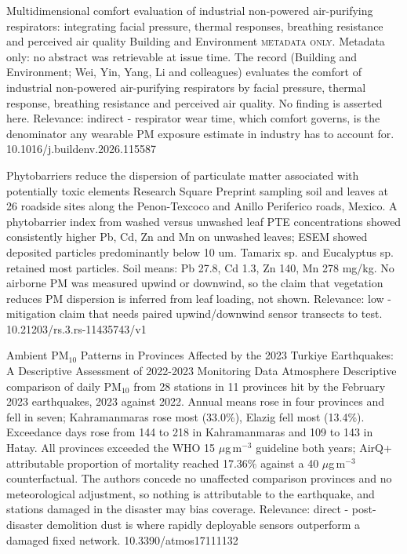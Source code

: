 \documentclass[10pt]{article}
\begin{document}
{Multidimensional comfort evaluation of industrial non-powered air-purifying respirators: integrating facial pressure, thermal responses, breathing resistance and perceived air quality}
{Building and Environment}
{\textsc{metadata only.} Metadata only: no abstract was retrievable at issue time. The record (Building and Environment; Wei, Yin, Yang, Li and colleagues) evaluates the comfort of industrial non-powered air-purifying respirators by facial pressure, thermal response, breathing resistance and perceived air quality. No finding is asserted here. Relevance: indirect - respirator wear time, which comfort governs, is the denominator any wearable PM exposure estimate in industry has to account for.}
{10.1016/j.buildenv.2026.115587}

\par{}\baselineskip{}\baselineskip
{}

{Phytobarriers reduce the dispersion of particulate matter associated with potentially toxic elements}
{Research Square}
{Preprint sampling soil and leaves at 26 roadside sites along the Penon-Texcoco and Anillo Periferico roads, Mexico. A phytobarrier index from washed versus unwashed leaf PTE concentrations showed consistently higher Pb, Cd, Zn and Mn on unwashed leaves; ESEM showed deposited particles predominantly below 10 um. Tamarix sp. and Eucalyptus sp. retained most particles. Soil means: Pb 27.8, Cd 1.3, Zn 140, Mn 278 mg/kg. No airborne PM was measured upwind or downwind, so the claim that vegetation reduces PM dispersion is inferred from leaf loading, not shown. Relevance: low - mitigation claim that needs paired upwind/downwind sensor transects to test.}
{10.21203/rs.3.rs-11435743/v1}

{Ambient PM$_{10}$ Patterns in Provinces Affected by the 2023 Turkiye Earthquakes: A Descriptive Assessment of 2022-2023 Monitoring Data}
{Atmosphere}
{Descriptive comparison of daily PM$_{10}$ from 28 stations in 11 provinces hit by the February 2023 earthquakes, 2023 against 2022. Annual means rose in four provinces and fell in seven; Kahramanmaras rose most (33.0\%), Elazig fell most (13.4\%). Exceedance days rose from 144 to 218 in Kahramanmaras and 109 to 143 in Hatay. All provinces exceeded the WHO 15 $\mu$g\,m$^{-3}$ guideline both years; AirQ+ attributable proportion of mortality reached 17.36\% against a 40 $\mu$g\,m$^{-3}$ counterfactual. The authors concede no unaffected comparison provinces and no meteorological adjustment, so nothing is attributable to the earthquake, and stations damaged in the disaster may bias coverage. Relevance: direct - post-disaster demolition dust is where rapidly deployable sensors outperform a damaged fixed network.}
{10.3390/atmos17111132}
\end{document}
